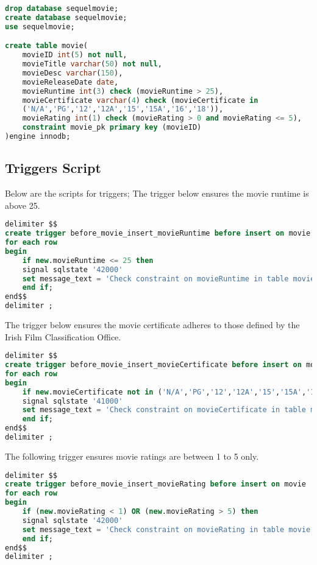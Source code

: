 \documentclass[12pt]{article}
\begin{document}
\begin{lstlisting}[language=SQL]
drop database sequelmovie;
create database sequelmovie;
use sequelmovie;

create table movie(
    movieID int(5) not null,
    movieTitle varchar(50) not null,
    movieDesc varchar(150),
    movieReleaseDate date,
    movieRuntime int(3) check (movieRuntime > 25),
    movieCertificate varchar(4) check (movieCertificate in
    ('N/A','PG','12','12A','15','15A','16','18')),
    movieRating int(1) check (movieRating > 0 and movieRating <= 5),
    constraint movie_pk primary key (movieID)
)engine innodb;

\end{lstlisting}

\subsection{Triggers Script}
Below are the scripts for triggers;\newline\newline
The trigger below ensures the movie runtime is above 25. 
\begin{lstlisting}[language=SQL]
delimiter $$
create trigger before_movie_insert_movieRuntime before insert on movie
for each row
begin
	if new.movieRuntime <= 25 then
	signal sqlstate '42000'
	set message_text = 'Check constraint on movieRuntime in table movie failed. Runtime too short';
	end if;
end$$
delimiter ;
\end{lstlisting}

\newpage
The trigger below ensures the movie certificate adheres to those defined by the Irish Film Classification Office.
\begin{lstlisting}[language=SQL]
delimiter $$
create trigger before_movie_insert_movieCertificate before insert on movie
for each row
begin
	if new.movieCertificate not in ('N/A','PG','12','12A','15','15A','16','18') then
    signal sqlstate '41000'
    set message_text = 'Check constraint on movieCertificate in table movie failed. Only Irish ratings';
    end if;
end$$
delimiter ;
\end{lstlisting}

The following trigger ensures movie ratings are between 1 to 5 only.
\begin{lstlisting}[language=SQL]
delimiter $$
create trigger before_movie_insert_movieRating before insert on movie
for each row
begin
	if (new.movieRating < 1) OR (new.movieRating > 5) then
	signal sqlstate '42000'
	set message_text = 'Check constraint on movieRating in table movie failed. Outrageous rating my good sir/madame';
	end if;
end$$
delimiter ;

\end{lstlisting}
\end{document}
